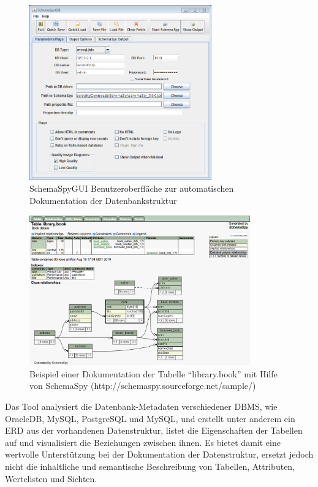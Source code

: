 \begin{figure}[!hbtp]
  \begin{center}
    \includegraphics[width=0.7\textwidth]{bilder/datenbanken_SchemaSpy_GUI}
  \end{center}
  \caption{SchemaSpyGUI Benutzeroberfläche zur automatischen Dokumentation der Datenbankstruktur}
  \label{abb:datenbanken-SchemaSpyGUI}
\end{figure}

\begin{figure}[!hbtp]
  \begin{center}
    \includegraphics[width=0.85\textwidth]{bilder/datenbanken_SchemaSpy_Documentation}
  \end{center}
  \caption{Beispiel einer Dokumentation der Tabelle "`library.book"' mit Hilfe von SchemaSpy (http://schemaspy.sourceforge.net/sample/)}
  \label{abb:datenbanken-schemaspydoku}
\end{figure} 

Das Tool analysiert die Datenbank-Metadaten verschiedener DBMS, wie OracleDB, MySQL, PostgreSQL und MySQL, und erstellt unter anderem ein ERD aus der vorhandenen Datenstruktur, listet die Eigenschaften der Tabellen auf und visualisiert die Beziehungen zwischen ihnen. Es bietet damit eine wertvolle Unterstützung bei der Dokumentation der Datenstruktur, ersetzt jedoch nicht die inhaltliche und semantische Beschreibung von Tabellen, Attributen, Wertelisten und Sichten.

